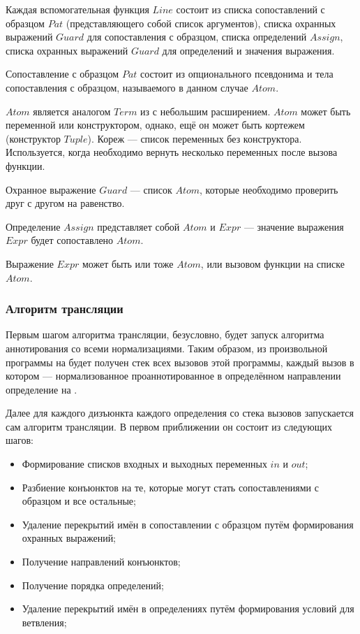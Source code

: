Каждая вспомогательная функция $Line$ состоит из списка сопоставлений с образцом $Pat$ (представляющего собой список аргументов), списка охранных выражений $Guard$ для сопоставления с образцом, списка определений $Assign$, списка охранных выражений $Guard$ для определений и значения выражения.

Сопоставление с образцом $Pat$ состоит из опционального псевдонима и тела сопоставления с образцом, называемого в данном случае $Atom$.

$Atom$ является аналогом $Term$ из \miniKanren{} с небольшим расширением.
$Atom$ может быть переменной или конструктором, однако, ещё он может быть кортежем (конструктор $Tuple$).
Кореж --- список переменных без конструктора.
Используется, когда необходимо вернуть несколько переменных после вызова функции.

Охранное выражение $Guard$ --- список $Atom$, которые необходимо проверить друг с другом на равенство.

Определение $Assign$ представляет собой $Atom$ и $Expr$ --- значение выражения $Expr$ будет сопоставлено $Atom$.

Выражение $Expr$ может быть или тоже $Atom$, или вызовом функции на списке $Atom$.


\subsubsection{Алгоритм трансляции}

Первым шагом алгоритма трансляции, безусловно, будет запуск алгоритма аннотирования со всеми нормализациями.
Таким образом, из произвольной программы на \miniKanren{} будет получен стек всех вызовов этой программы, каждый вызов в котором --- нормализованное проаннотированное в определённом направлении определение на \miniKanren{}.

Далее для каждого дизъюнкта каждого определения со стека вызовов запускается сам алгоритм трансляции.
В первом приближении он состоит из следующих шагов:
\begin{itemize}
    \item Формирование списков входных и выходных переменных $in$ и $out$;
    \item Разбиение конъюнктов на те, которые могут стать сопоставлениями с образцом и все остальные;
    \item Удаление перекрытий имён в сопоставлении с образцом путём формирования охранных выражений;
    \item Получение направлений конъюнктов;
    \item Получение порядка определений;
    \item Удаление перекрытий имён в определениях путём формирования условий для ветвления;
\end{itemize}

